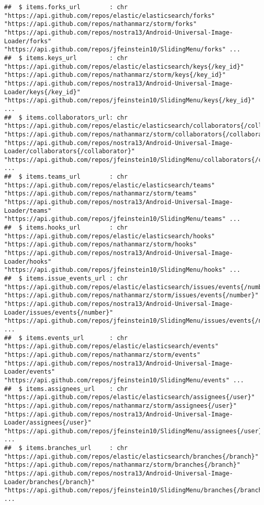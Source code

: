 \documentclass{article}\usepackage[]{graphicx}\usepackage[]{color}
\makeatletter
\newenvironment{kframe}{%
 \def\at@end@of@kframe{}%
 \ifinner\ifhmode%
  \def\at@end@of@kframe{\end{minipage}}%
  \begin{minipage}{\columnwidth}%
 \fi\fi%
 \def\FrameCommand##1{\hskip\@totalleftmargin \hskip-\fboxsep
 \colorbox{shadecolor}{##1}\hskip-\fboxsep
     \hskip-\linewidth \hskip-\@totalleftmargin \hskip\columnwidth}%
 \MakeFramed {\advance\hsize-\width
   \@totalleftmargin\z@ \linewidth\hsize
   \@setminipage}}%
 {\par\unskip\endMakeFramed%
 \at@end@of@kframe}
\newenvironment{knitrout}{}{} %
\makeatother
\begin{document}
\begin{knitrout}
\begin{kframe}
\begin{verbatim}
##  $ items.forks_url        : chr  "https://api.github.com/repos/elastic/elasticsearch/forks" "https://api.github.com/repos/nathanmarz/storm/forks" "https://api.github.com/repos/nostra13/Android-Universal-Image-Loader/forks" "https://api.github.com/repos/jfeinstein10/SlidingMenu/forks" ...
##  $ items.keys_url         : chr  "https://api.github.com/repos/elastic/elasticsearch/keys{/key_id}" "https://api.github.com/repos/nathanmarz/storm/keys{/key_id}" "https://api.github.com/repos/nostra13/Android-Universal-Image-Loader/keys{/key_id}" "https://api.github.com/repos/jfeinstein10/SlidingMenu/keys{/key_id}" ...
##  $ items.collaborators_url: chr  "https://api.github.com/repos/elastic/elasticsearch/collaborators{/collaborator}" "https://api.github.com/repos/nathanmarz/storm/collaborators{/collaborator}" "https://api.github.com/repos/nostra13/Android-Universal-Image-Loader/collaborators{/collaborator}" "https://api.github.com/repos/jfeinstein10/SlidingMenu/collaborators{/collaborator}" ...
##  $ items.teams_url        : chr  "https://api.github.com/repos/elastic/elasticsearch/teams" "https://api.github.com/repos/nathanmarz/storm/teams" "https://api.github.com/repos/nostra13/Android-Universal-Image-Loader/teams" "https://api.github.com/repos/jfeinstein10/SlidingMenu/teams" ...
##  $ items.hooks_url        : chr  "https://api.github.com/repos/elastic/elasticsearch/hooks" "https://api.github.com/repos/nathanmarz/storm/hooks" "https://api.github.com/repos/nostra13/Android-Universal-Image-Loader/hooks" "https://api.github.com/repos/jfeinstein10/SlidingMenu/hooks" ...
##  $ items.issue_events_url : chr  "https://api.github.com/repos/elastic/elasticsearch/issues/events{/number}" "https://api.github.com/repos/nathanmarz/storm/issues/events{/number}" "https://api.github.com/repos/nostra13/Android-Universal-Image-Loader/issues/events{/number}" "https://api.github.com/repos/jfeinstein10/SlidingMenu/issues/events{/number}" ...
##  $ items.events_url       : chr  "https://api.github.com/repos/elastic/elasticsearch/events" "https://api.github.com/repos/nathanmarz/storm/events" "https://api.github.com/repos/nostra13/Android-Universal-Image-Loader/events" "https://api.github.com/repos/jfeinstein10/SlidingMenu/events" ...
##  $ items.assignees_url    : chr  "https://api.github.com/repos/elastic/elasticsearch/assignees{/user}" "https://api.github.com/repos/nathanmarz/storm/assignees{/user}" "https://api.github.com/repos/nostra13/Android-Universal-Image-Loader/assignees{/user}" "https://api.github.com/repos/jfeinstein10/SlidingMenu/assignees{/user}" ...
##  $ items.branches_url     : chr  "https://api.github.com/repos/elastic/elasticsearch/branches{/branch}" "https://api.github.com/repos/nathanmarz/storm/branches{/branch}" "https://api.github.com/repos/nostra13/Android-Universal-Image-Loader/branches{/branch}" "https://api.github.com/repos/jfeinstein10/SlidingMenu/branches{/branch}" ...

\end{verbatim}
\end{kframe}
\end{knitrout}
\end{document}
